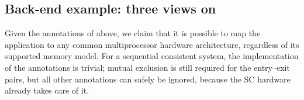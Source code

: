 \subsection{Back-end example: three views on \Starburst}

Given the annotations of above, we claim that it is possible to map the application to any common multiprocessor hardware architecture, regardless of its supported memory model.
For a sequential consistent system, the implementation of the annotations is trivial; mutual exclusion is still required for the entry--exit pairs, but all other annotations can safely be ignored, because the \ac{SC} hardware already takes care of it.


